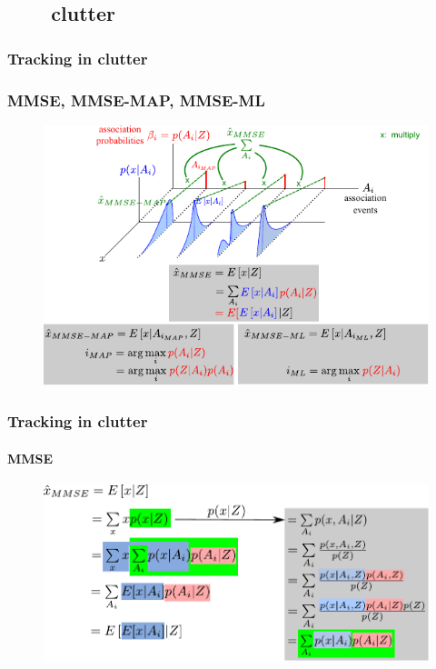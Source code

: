 \subsection{\ \ \ \ clutter}


\begin{frame}[plain]
\frametitle{Tracking in clutter}
\frametitle{MMSE, MMSE-MAP, MMSE-ML}
\logoCSIPCPL\mypagenum
	\begin{changemargin}{-1.3in}{0in}
		\begin{figure}
			\includegraphics[width=1.3\textwidth]{figs/TRK_clutter_all.pdf}
		\end{figure}
	\end{changemargin}
\end{frame}



\begin{frame}
\frametitle{Tracking in clutter}
\framesubtitle{MMSE}
\logoCSIPCPL\mypagenum
	\begin{figure}
		\includegraphics[width=1.0\textwidth]{figs/TRK_clutter_MMSE.pdf}
	\end{figure}
\end{frame}






